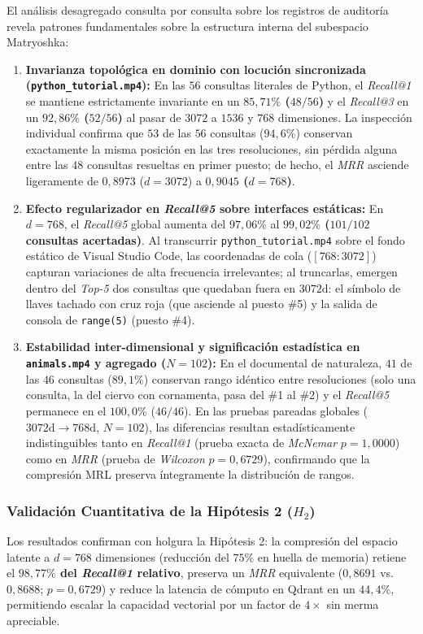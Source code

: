 El análisis desagregado consulta por consulta sobre los registros de auditoría revela patrones fundamentales sobre la estructura interna del subespacio Matryoshka:
\begin{enumerate}
    \item \textbf{Invarianza topológica en dominio con locución sincronizada (\texttt{python\_tutorial.mp4}):} En las $56$ consultas literales de Python, el \textit{Recall@1} se mantiene estrictamente invariante en un \textbf{$85,71\%$ ($48/56$)} y el \textit{Recall@3} en un \textbf{$92,86\%$ ($52/56$)} al pasar de $3072$ a $1536$ y $768$ dimensiones. La inspección individual confirma que $53$ de las $56$ consultas ($94,6\%$) conservan exactamente la misma posición en las tres resoluciones, sin pérdida alguna entre las $48$ consultas resueltas en primer puesto; de hecho, el \textit{MRR} asciende ligeramente de $0,8973$ ($d=3072$) a \textbf{$0,9045$ ($d=768$)}.
    \item \textbf{Efecto regularizador en \textit{Recall@5} sobre interfaces estáticas:} En $d=768$, el \textit{Recall@5} global aumenta del $97,06\%$ al \textbf{$99,02\%$ ($101/102$ consultas acertadas)}. Al transcurrir \texttt{python\_tutorial.mp4} sobre el fondo estático de Visual Studio Code, las coordenadas de cola ($[768:3072]$) capturan variaciones de alta frecuencia irrelevantes; al truncarlas, emergen dentro del \textit{Top-5} dos consultas que quedaban fuera en $3072\text{d}$: el símbolo de llaves tachado con cruz roja (que asciende al puesto \#5) y la salida de consola de \texttt{range(5)} (puesto \#4).
    \item \textbf{Estabilidad inter-dimensional y significación estadística en \texttt{animals.mp4} y agregado ($N=102$):} En el documental de naturaleza, $41$ de las $46$ consultas ($89,1\%$) conservan rango idéntico entre resoluciones (solo una consulta, la del ciervo con cornamenta, pasa del \#1 al \#2) y el \textit{Recall@5} permanece en el $100,0\%$ ($46/46$). En las pruebas pareadas globales ($3072\text{d} \to 768\text{d}$, $N=102$), las diferencias resultan estadísticamente indistinguibles tanto en \textit{Recall@1} (prueba exacta de \textit{McNemar} $p = 1,0000$) como en \textit{MRR} (prueba de \textit{Wilcoxon} $p = 0,6729$), confirmando que la compresión MRL preserva íntegramente la distribución de rangos.
\end{enumerate}

\subsubsection{Validación Cuantitativa de la Hipótesis 2 ($H_2$)}
Los resultados confirman con holgura la Hipótesis 2: la compresión del espacio latente a $d = 768$ dimensiones (reducción del $75\%$ en huella de memoria) retiene el \textbf{$98,77\%$ del \textit{Recall@1} relativo}, preserva un \textit{MRR} equivalente ($0,8691$ vs. $0,8688$; $p = 0,6729$) y reduce la latencia de cómputo en Qdrant en un \textbf{$44,4\%$}, permitiendo escalar la capacidad vectorial por un factor de $4\times$ sin merma apreciable.
